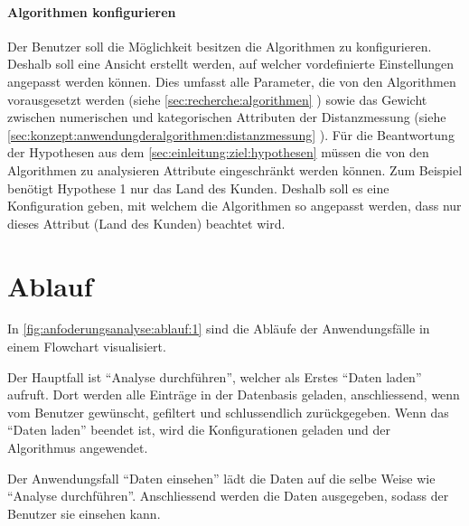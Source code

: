 \paragraph{Algorithmen konfigurieren} Der Benutzer soll die Möglichkeit besitzen die Algorithmen zu konfigurieren. Deshalb soll eine Ansicht erstellt werden, auf welcher vordefinierte Einstellungen angepasst werden können. Dies umfasst alle Parameter, die von den Algorithmen vorausgesetzt werden (siehe \cref{sec:recherche:algorithmen} ) sowie das Gewicht zwischen numerischen und kategorischen Attributen der Distanzmessung (siehe \cref{sec:konzept:anwendungderalgorithmen:distanzmessung} ). Für die Beantwortung der Hypothesen aus dem \cref{sec:einleitung:ziel:hypothesen}  müssen die von den Algorithmen zu analysieren Attribute eingeschränkt werden können. Zum Beispiel benötigt Hypothese 1 nur das Land des Kunden. Deshalb soll es eine Konfiguration geben, mit welchem die Algorithmen so angepasst werden, dass nur dieses Attribut (Land des Kunden) beachtet wird.



\section{Ablauf}
\label{sec:anforderungsanalyse:ablauf}
%
In \cref{fig:anfoderungsanalyse:ablauf:1} sind die Abläufe der Anwendungsfälle in einem Flowchart visualisiert. 

Der Hauptfall ist "`Analyse durchführen"', welcher als Erstes "`Daten laden"' aufruft. Dort werden alle Einträge in der Datenbasis geladen, anschliessend, wenn vom Benutzer gewünscht, gefiltert und schlussendlich zurückgegeben. Wenn das "`Daten laden"' beendet ist, wird die Konfigurationen geladen und der Algorithmus angewendet.

Der Anwendungsfall "`Daten einsehen"' lädt die Daten auf die selbe Weise wie "`Analyse durchführen"'. Anschliessend werden die Daten ausgegeben, sodass der Benutzer sie einsehen kann.

